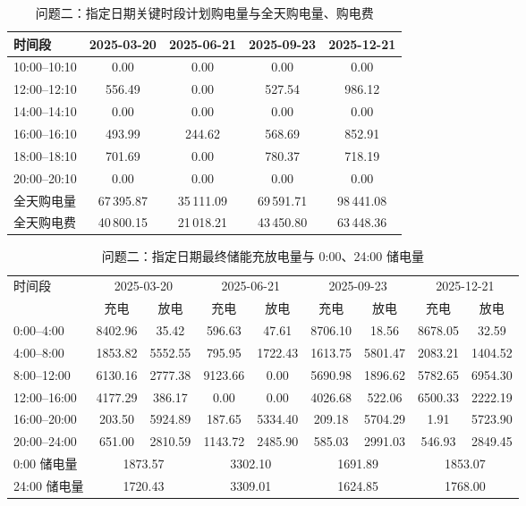 \documentclass[withoutpreface,bwprint]{cumcmthesis}
\begin{document}
\begin{table}[htbp]
\centering
\caption{问题二：指定日期关键时段计划购电量与全天购电量、购电费}
\label{tab:q2t1}
\begin{tabular}{@{}lcccc@{}}
\toprule
时间段 & 2025-03-20 & 2025-06-21 & 2025-09-23 & 2025-12-21 \\
\midrule
10:00--10:10 & 0.00 & 0.00 & 0.00 & 0.00 \\
12:00--12:10 & 556.49 & 0.00 & 527.54 & 986.12 \\
14:00--14:10 & 0.00 & 0.00 & 0.00 & 0.00 \\
16:00--16:10 & 493.99 & 244.62 & 568.69 & 852.91 \\
18:00--18:10 & 701.69 & 0.00 & 780.37 & 718.19 \\
20:00--20:10 & 0.00 & 0.00 & 0.00 & 0.00 \\
\midrule
全天购电量 & 67\,395.87 & 35\,111.09 & 69\,591.71 & 98\,441.08 \\
全天购电费 & 40\,800.15 & 21\,018.21 & 43\,450.80 & 63\,448.36 \\
\bottomrule
\end{tabular}
\end{table}

\begin{table}[htbp]
\centering
\caption{问题二：指定日期最终储能充放电量与 0:00、24:00 储电量}
\label{tab:q2t2}
\begin{tabular}{@{}lcccccccc@{}}
\toprule
\multirow{2}{*}{时间段} & \multicolumn{2}{c}{2025-03-20} & \multicolumn{2}{c}{2025-06-21} &
\multicolumn{2}{c}{2025-09-23} & \multicolumn{2}{c}{2025-12-21} \\
\cmidrule(lr){2-3}\cmidrule(lr){4-5}\cmidrule(lr){6-7}\cmidrule(lr){8-9}
& 充电 & 放电 & 充电 & 放电 & 充电 & 放电 & 充电 & 放电 \\
\midrule
0:00--4:00 & 8402.96 & 35.42 & 596.63 & 47.61 & 8706.10 & 18.56 & 8678.05 & 32.59 \\
4:00--8:00 & 1853.82 & 5552.55 & 795.95 & 1722.43 & 1613.75 & 5801.47 & 2083.21 & 1404.52 \\
8:00--12:00 & 6130.16 & 2777.38 & 9123.66 & 0.00 & 5690.98 & 1896.62 & 5782.65 & 6954.30 \\
12:00--16:00 & 4177.29 & 386.17 & 0.00 & 0.00 & 4026.68 & 522.06 & 6500.33 & 2222.19 \\
16:00--20:00 & 203.50 & 5924.89 & 187.65 & 5334.40 & 209.18 & 5704.29 & 1.91 & 5723.90 \\
20:00--24:00 & 651.00 & 2810.59 & 1143.72 & 2485.90 & 585.03 & 2991.03 & 546.93 & 2849.45 \\
\midrule
0:00 储电量 & \multicolumn{2}{c}{1873.57} & \multicolumn{2}{c}{3302.10} &
\multicolumn{2}{c}{1691.89} & \multicolumn{2}{c}{1853.07} \\
24:00 储电量 & \multicolumn{2}{c}{1720.43} & \multicolumn{2}{c}{3309.01} &
\multicolumn{2}{c}{1624.85} & \multicolumn{2}{c}{1768.00} \\
\bottomrule
\end{tabular}
\end{table}
\end{document}
